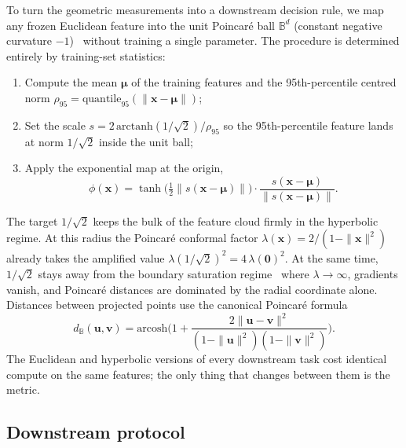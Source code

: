 \documentclass{article}
\begin{document}
To turn the geometric measurements into a downstream decision rule, we map any frozen Euclidean feature into the unit Poincar\'{e} ball $\mathbb{B}^d$ (constant negative curvature $-1$)~\citep{nickel2017poincare, ganea2018hyperbolic} without training a single parameter. The procedure is determined entirely by training-set statistics:
\begin{enumerate}[topsep=0pt,itemsep=1pt,leftmargin=*]
\item Compute the mean $\boldsymbol\mu$ of the training features and the 95th-percentile centred norm $\rho_{95} = \mathrm{quantile}_{95}(\|\boldsymbol{x} - \boldsymbol\mu\|)$;
\item Set the scale $s = 2\,\mathrm{arctanh}(1/\sqrt{2})/\rho_{95}$ so the 95th-percentile feature lands at norm $1/\sqrt{2}$ inside the unit ball;
\item Apply the exponential map at the origin,
\begin{equation}
\phi(\boldsymbol{x}) = \tanh\!\Big(\tfrac{1}{2}\|s(\boldsymbol{x}-\boldsymbol\mu)\|\Big) \cdot \frac{s(\boldsymbol{x}-\boldsymbol\mu)}{\|s(\boldsymbol{x}-\boldsymbol\mu)\|}.
\end{equation}
\end{enumerate}
The target $1/\sqrt{2}$ keeps the bulk of the feature cloud firmly in the hyperbolic regime. At this radius the Poincar\'{e} conformal factor $\lambda(\boldsymbol{x}) = 2/(1-\|\boldsymbol{x}\|^2)$ already takes the amplified value $\lambda(1/\sqrt{2})^2 = 4\,\lambda(\mathbf{0})^2$. At the same time, $1/\sqrt{2}$ stays away from the boundary saturation regime~\citep{guo2022clipped} where $\lambda \to \infty$, gradients vanish, and Poincar\'{e} distances are dominated by the radial coordinate alone. Distances between projected points use the canonical Poincar\'{e} formula
\begin{equation}
d_\mathbb{B}(\boldsymbol{u},\boldsymbol{v}) = \mathrm{arcosh}\Big(1 + \frac{2\|\boldsymbol{u}-\boldsymbol{v}\|^2}{(1-\|\boldsymbol{u}\|^2)(1-\|\boldsymbol{v}\|^2)}\Big).
\end{equation}
The Euclidean and hyperbolic versions of every downstream task cost identical compute on the same features; the only thing that changes between them is the metric.

\subsection{Downstream protocol}
\label{sec:downstream}
\end{document}
